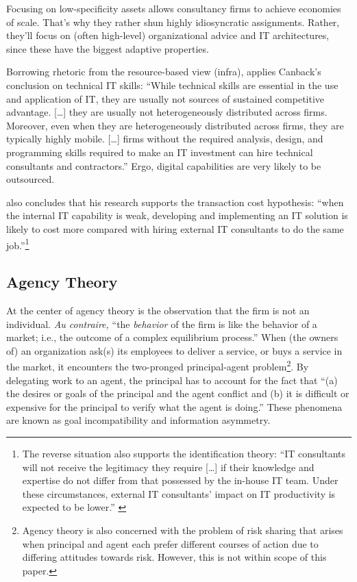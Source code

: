 \documentclass[12pt]{article}
\begin{document}
Focusing on low-specificity assets allows consultancy firms to achieve
economies of scale. That's why they rather shun highly idiosyncratic
assignments. Rather, they'll focus on (often high-level) organizational
advice and IT architectures, since these have the biggest adaptive
properties.

Borrowing rhetoric from the resource-based view (infra),
\citet[498]{mata1995} applies Canback's conclusion on technical IT
skills: ``While technical skills are essential in the use and
application of IT, they are usually not sources of sustained competitive
advantage. {[}\ldots{]} they are usually not heterogeneously distributed
across firms. Moreover, even when they are heterogeneously distributed
across firms, they are typically highly mobile. {[}\ldots{]} firms
without the required analysis, design, and programming skills required
to make an IT investment can hire technical consultants and
contractors.'' Ergo, digital capabilities are very likely to be
outsourced.

\citet[16-17]{nevo2007} also concludes that his research supports the
transaction cost hypothesis: ``when the internal IT capability is weak,
developing and implementing an IT solution is likely to cost more
compared with hiring external IT consultants to do the same
job.''\footnote{The reverse situation also supports the identification
  theory: ``IT consultants will not receive the legitimacy they require
  {[}\ldots{]} if their knowledge and expertise do not differ from that
  possessed by the in-house IT team. Under these circumstances, external
  IT consultants' impact on IT productivity is expected to be lower.''
  \citep[ 17]{nevo2007}}

\subsection{Agency Theory}\label{agency-theory}

At the center of agency theory is the observation that the firm is not
an individual. \emph{Au contraire,} ``the \emph{behavior} of the firm is
like the behavior of a market; i.e., the outcome of a complex
equilibrium process.'' \citep[ 311]{jensen1976} When (the owners of) an
organization ask(s) its employees to deliver a service, or buys a
service in the market, it encounters the two-pronged principal-agent
problem\footnote{Agency theory is also concerned with the problem of
  risk sharing that arises when principal and agent each prefer
  different courses of action due to differing attitudes towards risk.
  \citep[ 58]{eisenhardt1989} However, this is not within scope of this
  paper.}. By delegating work to an agent, the principal has to account
for the fact that ``(a) the desires or goals of the principal and the
agent conflict and (b) it is difficult or expensive for the principal to
verify what the agent is doing.'' \citep[ 58]{eisenhardt1989} These
phenomena are known as goal incompatibility and information asymmetry.
\end{document}
